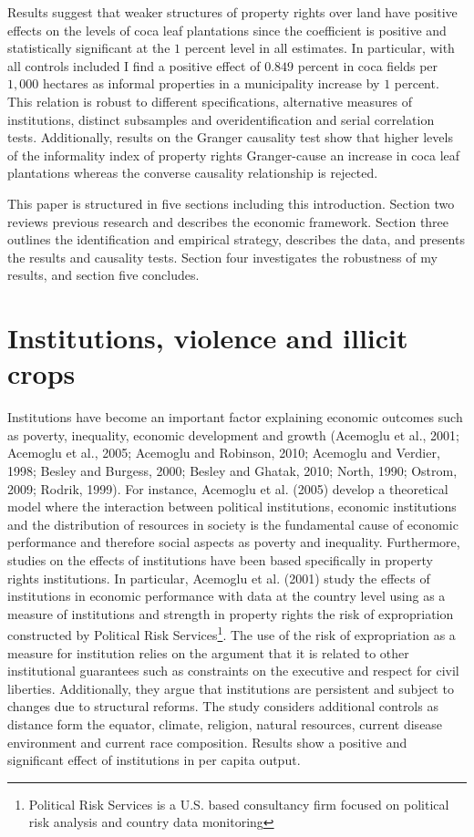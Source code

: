 \documentclass[a4paper, 12pt]{article}
\begin{document}
Results suggest that weaker structures of property rights over land have positive effects on the levels of coca leaf plantations since the coefficient is positive and statistically significant at the $1$ percent level in all estimates. In particular, with all controls included I find a positive effect of $0.849$ percent in coca fields per $1,000$ hectares as informal properties in a municipality increase by $1$ percent. This relation is robust to different specifications, alternative measures of institutions, distinct subsamples and overidentification and serial correlation tests. Additionally, results on the Granger causality test show that higher levels of the informality index of property rights Granger-cause an increase in coca leaf plantations whereas the converse causality relationship is rejected.

This paper is structured in five sections including this introduction. Section two reviews previous research and describes the economic framework. Section three outlines the identification and empirical strategy, describes the data, and presents the results and causality tests. Section four investigates the robustness of my results, and section five concludes.

\section{Institutions, violence and illicit crops}
\label{previous_res}

Institutions have become an important factor explaining economic outcomes such as poverty, inequality, economic development and growth (Acemoglu et al., 2001; Acemoglu et al., 2005; Acemoglu and Robinson, 2010; Acemoglu and Verdier, 1998; Besley and Burgess, 2000; Besley and Ghatak, 2010; North, 1990; Ostrom, 2009; Rodrik, 1999). For instance, Acemoglu et al. (2005) develop a theoretical model where the interaction between political institutions, economic institutions and the distribution of resources in society is the fundamental cause of economic performance and therefore social aspects as poverty and inequality. Furthermore, studies on the effects of institutions have been based specifically in property rights institutions. In particular, Acemoglu et al. (2001) study the effects of institutions in economic performance with data at the country level using as a measure of institutions and strength in property rights the risk of expropriation constructed by Political Risk Services\footnote{Political Risk Services is a U.S. based consultancy firm focused on political risk analysis and country data monitoring}. The use of the risk of expropriation as a measure for institution relies on the argument that it is related to other institutional guarantees such as constraints on the executive and respect for civil liberties. Additionally, they argue that institutions are persistent and subject to changes due to structural reforms. The study considers additional controls as distance form the equator, climate, religion, natural resources, current disease environment and current race composition. Results show a positive and significant effect of institutions in per capita output.
\end{document}
